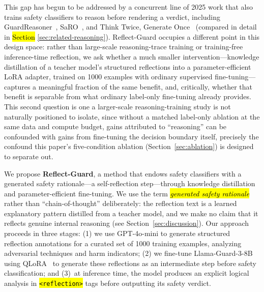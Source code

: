 \documentclass[superintelligence,article,accept,moreauthors]{Definitions/mdpi}
\begin{document}
This gap has begun to be addressed by a concurrent line of 2025 work that also trains safety classifiers to reason before rendering a verdict, including GuardReasoner~\citep{liu2025guardreasoner}, SaRO~\citep{mou2025saro}, and Think Twice, Generate Once~\citep{phan2025thinktwice} (compared in detail in \hl{Section} %
 \ref{sec:related-reasoning}). Reflect-Guard occupies a different point in this design space: rather than large-scale reasoning-trace training or training-free inference-time reflection, we ask whether a much smaller intervention---knowledge distillation of a teacher model's structured reflections into a parameter-efficient LoRA adapter, trained on 1000 examples with ordinary supervised fine-tuning---captures a meaningful fraction of the same benefit, and, critically, whether that benefit is separable from what ordinary label-only fine-tuning already provides. This second question is one a larger-scale reasoning-training study is not naturally positioned to isolate, since without a matched label-only ablation at the same data and compute budget, gains attributed to ``reasoning'' can be confounded with gains from fine-tuning the decision boundary itself, precisely the confound this paper's five-condition ablation (Section~\ref{sec:ablation}) is designed to separate out.

We propose \textbf{Reflect-Guard}, a method that endows safety classifiers with a generated safety rationale---a self-reflection step---through knowledge distillation and parameter-efficient fine-tuning. We use the term \emph{\hl{generated safety rationale} %
} rather than ``chain-of-thought'' deliberately: the reflection text is a learned explanatory pattern distilled from a teacher model, and we make no claim that it reflects genuine internal reasoning (see Section~\ref{sec:discussion}). Our approach proceeds in three stages: (1) we use GPT-4o-mini to generate structured reflection annotations for a curated set of 1000 training examples, analyzing adversarial techniques and harm indicators; (2) we fine-tune Llama-Guard-3-8B using QLoRA~\citep{dettmers2024qlora} to generate these reflections as an intermediate step before safety classification; and (3)~at inference time, the model produces an explicit logical analysis in \hl{\texttt{<reflection>} %
} tags before outputting its safety verdict.
\end{document}
